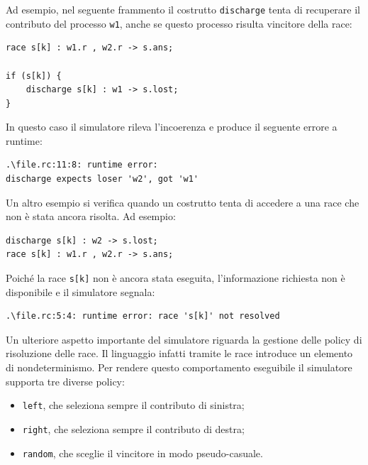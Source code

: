 Ad esempio, nel seguente frammento il costrutto \texttt{discharge} tenta di recuperare il contributo del processo \texttt{w1}, anche se questo processo risulta vincitore della race:

\begin{tcolorbox}[colback=white,colframe=black!35,boxrule=0.4pt]
\begin{lstlisting}
race s[k] : w1.r , w2.r -> s.ans;

if (s[k]) {
    discharge s[k] : w1 -> s.lost;
}
\end{lstlisting}
\end{tcolorbox}

In questo caso il simulatore rileva l’incoerenza e produce il seguente errore a runtime:

\begin{tcolorbox}[colback=black!2,colframe=black!35,boxrule=0.4pt]
\begin{verbatim}
.\file.rc:11:8: runtime error:
discharge expects loser 'w2', got 'w1'
\end{verbatim}
\end{tcolorbox}

Un altro esempio si verifica quando un costrutto tenta di accedere a una race che non è stata ancora risolta. Ad esempio:

\begin{tcolorbox}[colback=white,colframe=black!35,boxrule=0.4pt]
\begin{lstlisting}
discharge s[k] : w2 -> s.lost;
race s[k] : w1.r , w2.r -> s.ans;
\end{lstlisting}
\end{tcolorbox}

Poiché la race \texttt{s[k]} non è ancora stata eseguita, l’informazione richiesta non è disponibile e il simulatore segnala:

\begin{tcolorbox}[colback=black!2,colframe=black!35,boxrule=0.4pt]
\begin{verbatim}
.\file.rc:5:4: runtime error: race 's[k]' not resolved
\end{verbatim}
\end{tcolorbox}

Un ulteriore aspetto importante del simulatore riguarda la gestione delle policy di risoluzione delle race. Il linguaggio infatti tramite le race introduce un elemento di nondeterminismo. Per rendere questo comportamento eseguibile il simulatore supporta tre diverse policy:

\begin{itemize}
\item \texttt{left}, che seleziona sempre il contributo di sinistra;
\item \texttt{right}, che seleziona sempre il contributo di destra;
\item \texttt{random}, che sceglie il vincitore in modo pseudo-casuale.
\end{itemize}

